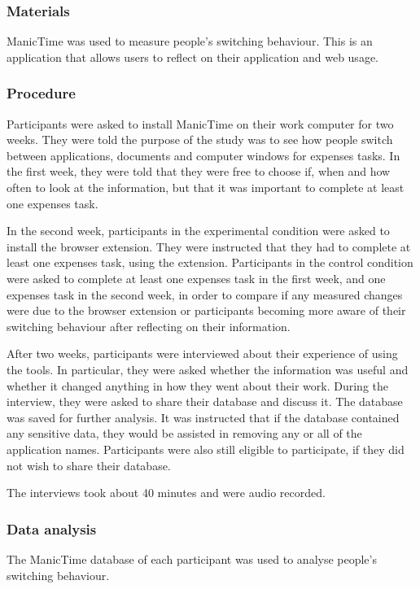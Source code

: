 \subsubsection{Materials}
ManicTime was used to measure people's switching behaviour. This is an application that allows users to reflect on their application and web usage. 

\subsubsection{Procedure}
Participants were asked to install ManicTime on their work computer for two weeks. They were told the purpose of the study was to see how people switch between applications, documents and computer windows for expenses tasks. In the first week, they were told that they were free to choose if, when and how often to look at the information, but that it was important to complete at least one expenses task.

In the second week, participants in the experimental condition were asked to install the browser extension. They were instructed that they had to complete at least one expenses task, using the extension. Participants in the control condition were asked to complete at least one expenses task in the first week, and one expenses task in the second week, in order to compare if any measured changes were due to the browser extension or participants becoming more aware of their switching behaviour after reflecting on their information. 

After two weeks, participants were interviewed about their experience of using the tools. In particular, they were asked whether the information was useful and whether it changed anything in how they went about their work. During the interview, they were asked to share their database and discuss it. The database was saved for further analysis. It was instructed that if the database contained any sensitive data, they would be assisted in removing any or all of the application names. Participants were also still eligible to participate, if they did not wish to share their database.

The interviews took about 40 minutes and were audio recorded.

\subsubsection{Data analysis}
The ManicTime database of each participant was used to analyse people's switching behaviour. 

